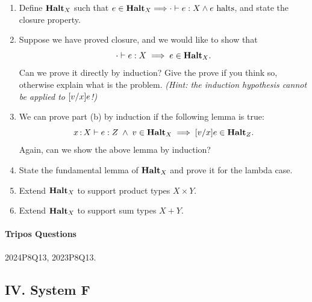 \documentclass[11pt,a4paper,twoside]{article}
\begin{document}
\begin{enumerate}[label=(\alph*)]
  \item Define $\textbf{Halt}_X$ such that
    $e \in \textbf{Halt}_X \Longrightarrow \cdot \vdash e : X \wedge e\text{ halts}$,
    and state the closure property.

  \item Suppose we have proved closure, and we would like to show that
    \[ \cdot \vdash e : X \;\Longrightarrow\; e \in \textbf{Halt}_X. \]
    Can we prove it directly by induction?
    Give the prove if you think so, otherwise explain what is the problem.
    \emph{(Hint: the induction hypothesis cannot be applied to
    $[v / x] e$!)}

  \item We can prove part (b) by induction if the following lemma is true:
    \[
      x \,{:}\, X \vdash e : Z \;\wedge\;
      v \in \textbf{Halt}_X \;\Longrightarrow\;
      [v / x] e \in \textbf{Halt}_Z.
    \]
    Again, can we show the above lemma by induction?

  \item State the fundamental lemma of $\textbf{Halt}_X$ and prove it for the
    lambda case.

  \item Extend $\textbf{Halt}_X$ to support product types $X \times Y$.

  \item Extend $\textbf{Halt}_X$ to support sum types $X + Y$.
\end{enumerate}

\paragraph{Tripos Questions} 2024P8Q13, 2023P8Q13.

\subsection*{IV. System F}

\end{document}
